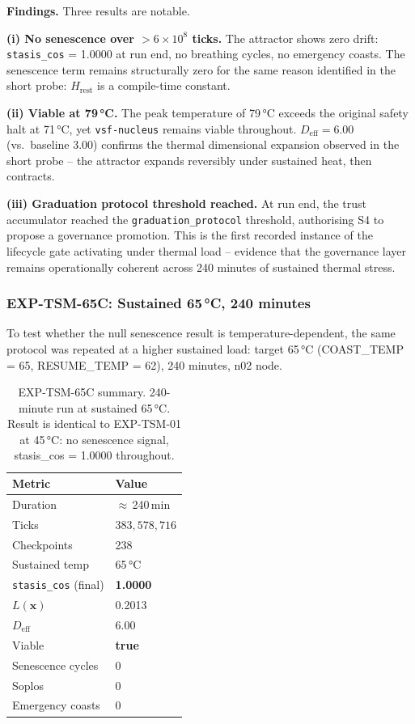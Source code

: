 \documentclass[11pt, a4paper]{article}
\newcommand{\nucleus}{\texttt{vsf-nucleus}}
\begin{document}
\textbf{Findings.}
Three results are notable.

\textbf{(i) No senescence over $>6 \times 10^8$ ticks.}
The attractor shows zero drift: \texttt{stasis\_cos} = 1.0000 at run end,
no breathing cycles, no emergency coasts.
The senescence term remains structurally zero for the same reason identified
in the short probe: $H_\text{rest}$ is a compile-time constant.

\textbf{(ii) Viable at 79\,°C.}
The peak temperature of 79\,°C exceeds the original safety halt at 71\,°C,
yet \nucleus{} remains viable throughout.
$D_\text{eff} = 6.00$ (vs.\ baseline 3.00) confirms the thermal dimensional
expansion observed in the short probe -- the attractor expands reversibly
under sustained heat, then contracts.

\textbf{(iii) Graduation protocol threshold reached.}
At run end, the trust accumulator reached the \texttt{graduation\_protocol}
threshold, authorising S4 to propose a governance promotion.
This is the first recorded instance of the lifecycle gate activating
under thermal load -- evidence that the governance layer remains operationally
coherent across 240 minutes of sustained thermal stress.

\subsubsection*{EXP-TSM-65C: Sustained 65\,°C, 240 minutes}

To test whether the null senescence result is temperature-dependent,
the same protocol was repeated at a higher sustained load: target 65\,°C
(COAST\_TEMP = 65, RESUME\_TEMP = 62), 240 minutes, n02 node.

\begin{table}[!htb]
\centering
\begin{tabular}{ll}
\toprule
Metric & Value \\
\midrule
Duration & $\approx$\,240\,min \\
Ticks & $383{,}578{,}716$ \\
Checkpoints & 238 \\
Sustained temp & 65\,°C \\
\texttt{stasis\_cos} (final) & \textbf{1.0000} \\
$L(\mathbf{x})$ & 0.2013 \\
$D_\text{eff}$ & 6.00 \\
Viable & \textbf{true} \\
Senescence cycles & 0 \\
Soplos & 0 \\
Emergency coasts & 0 \\
\bottomrule
\end{tabular}
\caption{EXP-TSM-65C summary. 240-minute run at sustained 65\,°C.
Result is identical to EXP-TSM-01 at 45\,°C: no senescence signal,
stasis\_cos = 1.0000 throughout.}
\label{tab:tsm65c}
\end{table}
\end{document}
